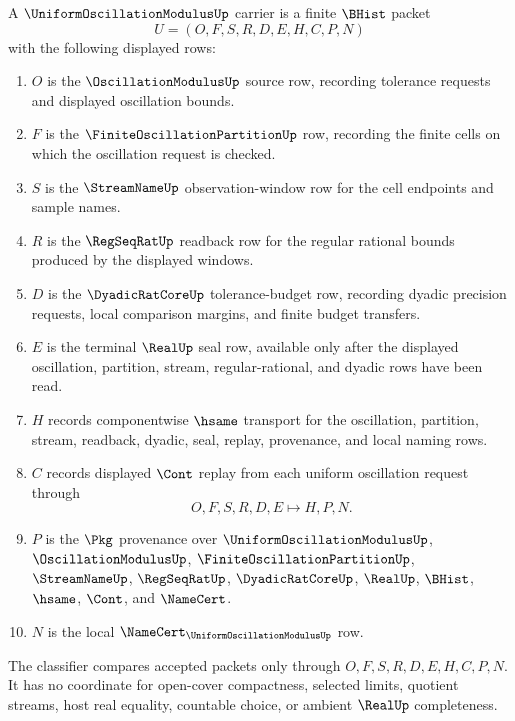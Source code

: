 \begin{definition}
\label{def:uniform-oscillation-modulus-carrier}
A $\UniformOscillationModulusUp$ carrier is a finite $\BHist$ packet
$$
U=(O,F,S,R,D,E,H,C,P,N)
$$
with the following displayed rows:
\begin{enumerate}
\item $O$ is the $\OscillationModulusUp$ source row, recording tolerance requests and displayed oscillation bounds.
\item $F$ is the $\FiniteOscillationPartitionUp$ row, recording the finite cells on which the oscillation request is checked.
\item $S$ is the $\StreamNameUp$ observation-window row for the cell endpoints and sample names.
\item $R$ is the $\RegSeqRatUp$ readback row for the regular rational bounds produced by the displayed windows.
\item $D$ is the $\DyadicRatCoreUp$ tolerance-budget row, recording dyadic precision requests, local comparison margins, and finite budget transfers.
\item $E$ is the terminal $\RealUp$ seal row, available only after the displayed oscillation, partition, stream, regular-rational, and dyadic rows have been read.
\item $H$ records componentwise $\hsame$ transport for the oscillation, partition, stream, readback, dyadic, seal, replay, provenance, and local naming rows.
\item $C$ records displayed $\Cont$ replay from each uniform oscillation request through
$$
O,F,S,R,D,E \longmapsto H,P,N .
$$
\item $P$ is the $\Pkg$ provenance over $\UniformOscillationModulusUp$, $\OscillationModulusUp$, $\FiniteOscillationPartitionUp$, $\StreamNameUp$, $\RegSeqRatUp$, $\DyadicRatCoreUp$, $\RealUp$, $\BHist$, $\hsame$, $\Cont$, and $\NameCert$.
\item $N$ is the local $\NameCert_{\UniformOscillationModulusUp}$ row.
\end{enumerate}
The classifier compares accepted packets only through $O,F,S,R,D,E,H,C,P,N$. It has no coordinate for open-cover compactness, selected limits, quotient streams, host real equality, countable choice, or ambient $\RealUp$ completeness.
\end{definition}

